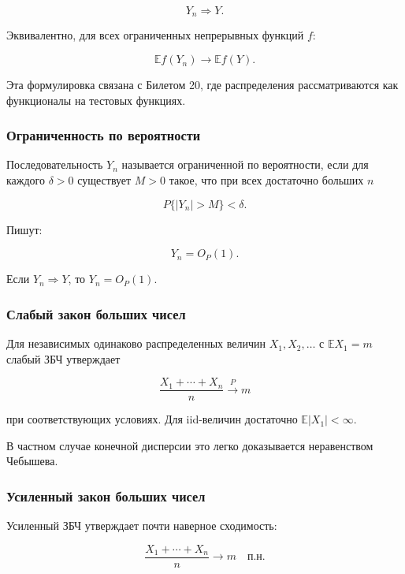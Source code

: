 \documentclass[
  11pt,
  a4paper,
]{article}
\begin{document}
\[
Y_n\Rightarrow Y.
\]

Эквивалентно, для всех ограниченных непрерывных функций \(f\):

\[
\mathbb Ef(Y_n)\to\mathbb Ef(Y).
\]

Эта формулировка связана с Билетом 20, где распределения рассматриваются
как функционалы на тестовых функциях.

\subsubsection{Ограниченность по
вероятности}\label{ux43eux433ux440ux430ux43dux438ux447ux435ux43dux43dux43eux441ux442ux44c-ux43fux43e-ux432ux435ux440ux43eux44fux442ux43dux43eux441ux442ux438}

Последовательность \(Y_n\) называется ограниченной по вероятности, если
для каждого \(\delta>0\) существует \(M>0\) такое, что при всех
достаточно больших \(n\)

\[
P\{|Y_n|>M\}<\delta.
\]

Пишут:

\[
Y_n=O_P(1).
\]

Если \(Y_n\Rightarrow Y\), то \(Y_n=O_P(1)\).

\subsubsection{Слабый закон больших
чисел}\label{ux441ux43bux430ux431ux44bux439-ux437ux430ux43aux43eux43d-ux431ux43eux43bux44cux448ux438ux445-ux447ux438ux441ux435ux43b}

Для независимых одинаково распределенных величин \(X_1,X_2,\ldots\) с
\(\mathbb EX_1=m\) слабый ЗБЧ утверждает

\[
\frac{X_1+\cdots+X_n}{n}\xrightarrow{P}m
\]

при соответствующих условиях. Для iid-величин достаточно
\(\mathbb E|X_1|<\infty\).

В частном случае конечной дисперсии это легко доказывается неравенством
Чебышева.

\subsubsection{Усиленный закон больших
чисел}\label{ux443ux441ux438ux43bux435ux43dux43dux44bux439-ux437ux430ux43aux43eux43d-ux431ux43eux43bux44cux448ux438ux445-ux447ux438ux441ux435ux43b}

Усиленный ЗБЧ утверждает почти наверное сходимость:

\[
\frac{X_1+\cdots+X_n}{n}\to m
\quad\text{п.н.}
\]
\end{document}
